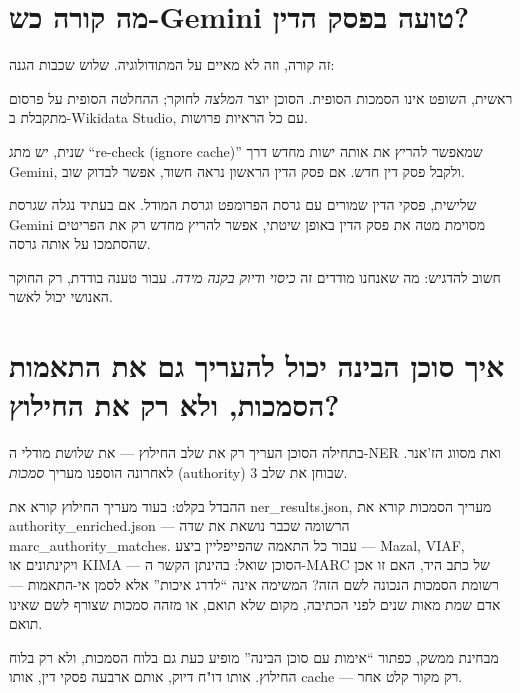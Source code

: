 \documentclass[12pt,a4paper]{article}
\begin{document}
\section{\texthebrew{מה קורה כש-Gemini טועה בפסק הדין?}}
\begin{hebrew}
זה קורה, וזה לא מאיים על המתודולוגיה. שלוש שכבות הגנה:
\par
ראשית, השופט אינו הסמכות הסופית. הסוכן יוצר \emph{המלצה} לחוקר; ההחלטה הסופית על פרסום מתקבלת ב-Wikidata Studio, עם כל הראיות פרושות.
\par
שנית, יש מתג ``re-check (ignore cache)'' שמאפשר להריץ את אותה ישות מחדש דרך Gemini, ולקבל פסק דין חדש. אם פסק הדין הראשון נראה חשוד, אפשר לבדוק שוב.
\par
שלישית, פסקי הדין שמורים עם גרסת הפרומפט וגרסת המודל. אם בעתיד נגלה שגרסת Gemini מסוימת מטה את פסק הדין באופן שיטתי, אפשר להריץ מחדש רק את הפריטים שהסתמכו על אותה גרסה.
\par
חשוב להדגיש: מה שאנחנו מודדים זה \emph{כיסוי} ו\emph{דיוק בקנה מידה}. עבור טענה בודדת, רק החוקר האנושי יכול לאשר.
\end{hebrew}


\section{\texthebrew{איך סוכן הבינה יכול להעריך גם את התאמות הסמכות, ולא רק את החילוץ?}}
\begin{hebrew}
בתחילה הסוכן העריך רק את שלב החילוץ --- את שלושת מודלי ה-NER ואת מסווג הז'אנר. לאחרונה הוספנו מעריך \emph{סמכות} (authority) שבוחן את שלב 3.
\par
ההבדל בקלט: בעוד מעריך החילוץ קורא את \texthebrew{ner\_results.json}, מעריך הסמכות קורא את \texthebrew{authority\_enriched.json} --- הרשומה שכבר נושאת את שדה \texthebrew{marc\_authority\_matches}. עבור כל התאמה שהפייפליין ביצע --- Mazal, VIAF, ויקינתונים או KIMA --- הסוכן שואל: בהינתן הקשר ה-MARC של כתב היד, האם זו אכן רשומת הסמכות הנכונה לשם הזה? המשימה אינה ``לדרג איכות'' אלא לסמן אי-התאמות --- אדם שמת מאות שנים לפני הכתיבה, מקום שלא תואם, או מזהה סמכות שצורף לשם שאינו תואם.
\par
מבחינת ממשק, כפתור ``אימות עם סוכן הבינה'' מופיע כעת גם בלוח הסמכות, ולא רק בלוח החילוץ. אותו דו"ח דיוק, אותם ארבעה פסקי דין, אותו cache --- רק מקור קלט אחר.
\end{hebrew}
\end{document}
